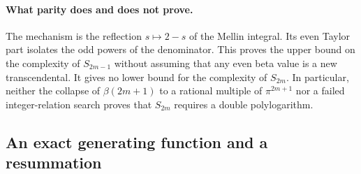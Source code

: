 \documentclass[11pt,a4paper]{article}
\theoremstyle{definition}
\theoremstyle{remark}
\numberwithin{equation}{section}
\begin{document}
\paragraph{What parity does and does not prove.}
The mechanism is the reflection $s\mapsto2-s$ of the Mellin integral.
Its even Taylor part isolates the odd powers of the denominator. This
proves the upper bound on the complexity of $S_{2m-1}$ without assuming
that any even beta value is a new transcendental.
It gives no lower bound for the complexity of $S_{2m}$.
In particular, neither the collapse of $\beta(2m+1)$ to a rational multiple
of $\pi^{2m+1}$ nor a failed integer-relation search proves that
$S_{2m}$ requires a double polylogarithm.

\subsection{An exact generating function and a resummation}
\end{document}
